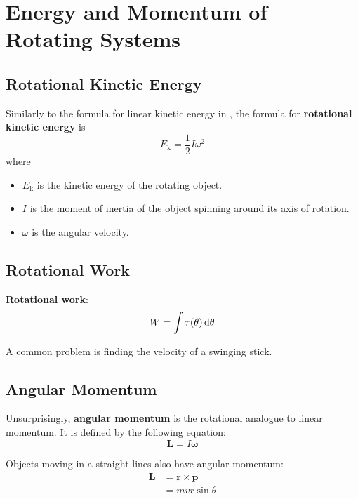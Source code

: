 \documentclass[a4paper, titlepage]{book}
\begin{document}
\chapter{Energy and Momentum of Rotating Systems}

\section{Rotational Kinetic Energy}

Similarly to the formula for linear kinetic energy in ,
the formula for \textbf{rotational kinetic energy} is
\begin{equation}
    E_\mathrm{k} = \frac{1}{2} I \omega^2
\end{equation}
where
\begin{itemize}
    \item \(E_\mathrm{k}\) is the kinetic energy of the rotating object.
    \item \(I\) is the moment of inertia of the object spinning around its axis of rotation.
    \item \(\omega\) is the angular velocity.
\end{itemize}

\section{Rotational Work}

\textbf{Rotational work}:
\begin{equation}
    W = \int \tau(\theta) \odif{\theta}
\end{equation}

A common problem is finding the velocity of a swinging stick.

\section{Angular Momentum}

Unsurprisingly, \textbf{angular momentum} is the rotational analogue to linear momentum.
It is defined by the following equation:
\begin{equation}
    \bm{L} = I \bm{\omega}
\end{equation}

Objects moving in a straight lines also have angular momentum:
\begin{equation}
    \begin{aligned}
        \bm{L} &= \bm{r} \times \bm{p} \\
        &= m v r \sin\theta
    \end{aligned}
\end{equation}
\end{document}
